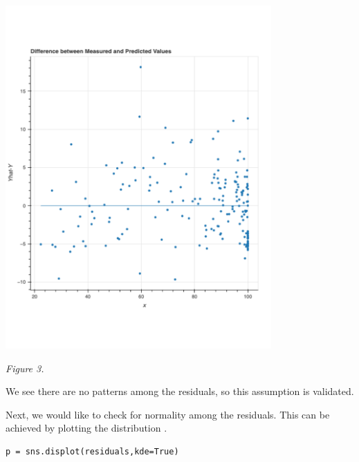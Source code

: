\documentclass[12pt]{article}
\begin{document}
\begin{center}
\includegraphics[width=4in]{figure5.pdf}
\end{center}

\vspace{-50pt}

\begin{center}
    \textit{Figure 3.}
\end{center}

\newpage

We see there are no patterns among the residuals, so this assumption is validated.

\vspace{15pt}

Next, we would like to check for normality among the residuals. This can be achieved by plotting the distribution \citep{kaggleassumptions}.

\begin{adjustwidth}{0.5in}{0.5in}
\begin{lstlisting}
p = sns.displot(residuals,kde=True)
\end{lstlisting}
\end{adjustwidth}

\vspace{-150pt}
\end{document}
